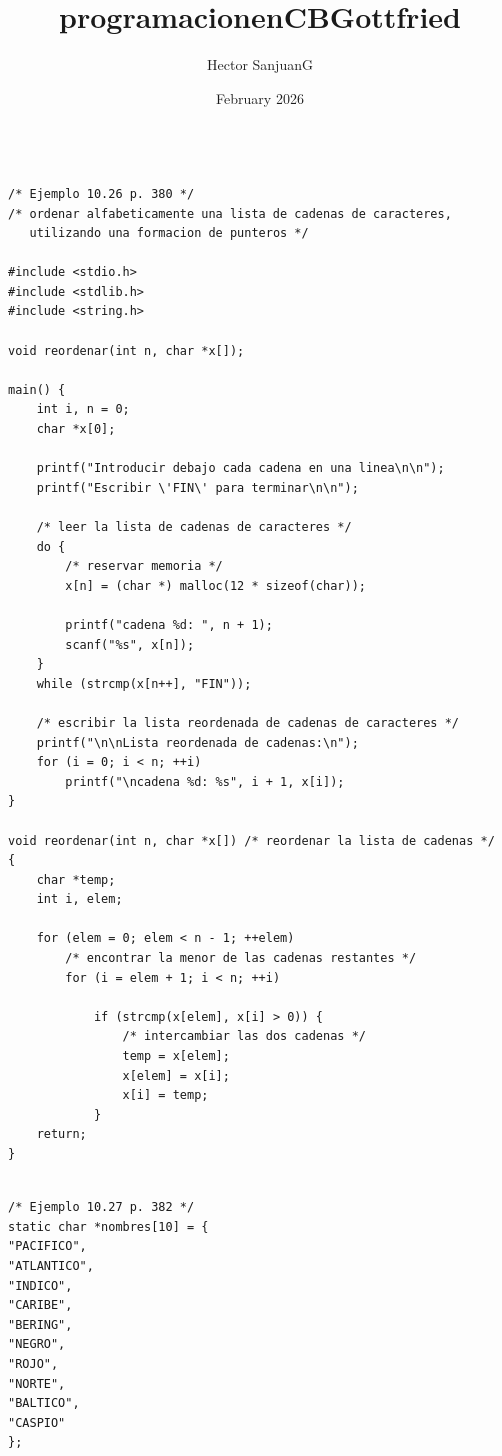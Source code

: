 \documentclass{article}
\title{programacionenCBGottfried}
\author{Hector SanjuanG}
\date{February 2026}
\begin{document}
\begin{verbatim}

/* Ejemplo 10.26 p. 380 */
/* ordenar alfabeticamente una lista de cadenas de caracteres,
   utilizando una formacion de punteros */
   
#include <stdio.h>
#include <stdlib.h>
#include <string.h>

void reordenar(int n, char *x[]);

main() {
    int i, n = 0;
    char *x[0];
    
    printf("Introducir debajo cada cadena en una linea\n\n");
    printf("Escribir \'FIN\' para terminar\n\n");
    
    /* leer la lista de cadenas de caracteres */
    do {
        /* reservar memoria */
        x[n] = (char *) malloc(12 * sizeof(char));

        printf("cadena %d: ", n + 1);
        scanf("%s", x[n]);
    }
    while (strcmp(x[n++], "FIN"));

    /* escribir la lista reordenada de cadenas de caracteres */
    printf("\n\nLista reordenada de cadenas:\n");
    for (i = 0; i < n; ++i)
        printf("\ncadena %d: %s", i + 1, x[i]);
}

void reordenar(int n, char *x[]) /* reordenar la lista de cadenas */
{
    char *temp;
    int i, elem;
    
    for (elem = 0; elem < n - 1; ++elem)
        /* encontrar la menor de las cadenas restantes */
        for (i = elem + 1; i < n; ++i)
            
            if (strcmp(x[elem], x[i] > 0)) {
                /* intercambiar las dos cadenas */
                temp = x[elem];
                x[elem] = x[i];
                x[i] = temp;
            }
    return;
}
\end{verbatim}

\begin{verbatim}

/* Ejemplo 10.27 p. 382 */
static char *nombres[10] = {
"PACIFICO",
"ATLANTICO",
"INDICO",
"CARIBE",
"BERING",
"NEGRO",
"ROJO",
"NORTE",
"BALTICO",
"CASPIO"
};

\end{verbatim}
\end{document}
